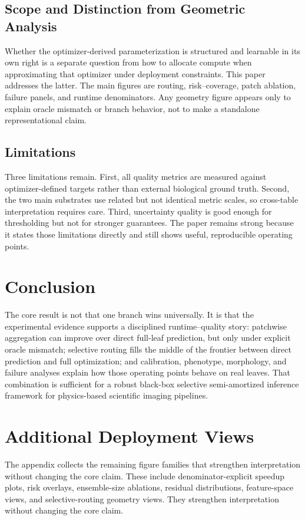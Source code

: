 \documentclass[11pt,a4paper]{article}
\begin{document}
\subsection{Scope and Distinction from Geometric Analysis}
Whether the optimizer-derived parameterization is structured and learnable in its own right is a separate question from how to allocate compute when approximating that optimizer under deployment constraints.
This paper addresses the latter.
The main figures are routing, risk--coverage, patch ablation, failure panels, and runtime denominators.
Any geometry figure appears only to explain oracle mismatch or branch behavior, not to make a standalone representational claim.

\subsection{Limitations}
Three limitations remain.
First, all quality metrics are measured against optimizer-defined targets rather than external biological ground truth.
Second, the two main substrates use related but not identical metric scales, so cross-table interpretation requires care.
Third, uncertainty quality is good enough for thresholding but not for stronger guarantees.
The paper remains strong because it states those limitations directly and still shows useful, reproducible operating points.

\section{Conclusion}
The core result is not that one branch wins universally.
It is that the experimental evidence supports a disciplined runtime--quality story: patchwise aggregation can improve over direct full-leaf prediction, but only under explicit oracle mismatch; selective routing fills the middle of the frontier between direct prediction and full optimization; and calibration, phenotype, morphology, and failure analyses explain how those operating points behave on real leaves.
That combination is sufficient for a robust black-box selective semi-amortized inference framework for physics-based scientific imaging pipelines.

\appendix
\clearpage
\section{Additional Deployment Views}
The appendix collects the remaining figure families that strengthen interpretation without changing the core claim.
These include denominator-explicit speedup plots, risk overlays, ensemble-size ablations, residual distributions, feature-space views, and selective-routing geometry views.
They strengthen interpretation without changing the core claim.
\end{document}
